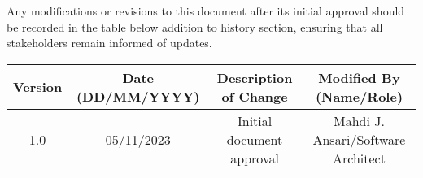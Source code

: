 Any modifications or revisions to this document after its initial approval should be recorded in the table below addition to history section, ensuring that all stakeholders remain informed of updates.

\begin{table}[h]
    \centering
    \begin{tabular}{|c|c|c|c|}
    \hline
    \textbf{Version} & \textbf{Date (DD/MM/YYYY)} & \textbf{Description of Change} & \textbf{Modified By (Name/Role)} \\
    \hline
    1.0 & 05/11/2023 & Initial document approval & Mahdi J. Ansari/Software Architect \\
    \hline
    \end{tabular}
\end{table}